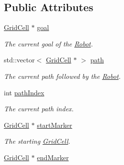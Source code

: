 \subsection*{Public Attributes}
\begin{DoxyCompactItemize}
\item 
\hyperlink{classGridCell}{Grid\+Cell} $\ast$ \hyperlink{classRobot_a5abff8bb9893b5fbd509c20e7fa2ffb5}{goal}\hypertarget{classRobot_a5abff8bb9893b5fbd509c20e7fa2ffb5}{}\label{classRobot_a5abff8bb9893b5fbd509c20e7fa2ffb5}

\begin{DoxyCompactList}\small\item\em The current goal of the \hyperlink{classRobot}{Robot}. \end{DoxyCompactList}\item 
std\+::vector$<$ \hyperlink{classGridCell}{Grid\+Cell} $\ast$ $>$ \hyperlink{classRobot_a6a62d6834a3be1352b81d380cc396e7b}{path}\hypertarget{classRobot_a6a62d6834a3be1352b81d380cc396e7b}{}\label{classRobot_a6a62d6834a3be1352b81d380cc396e7b}

\begin{DoxyCompactList}\small\item\em The current path followed by the \hyperlink{classRobot}{Robot}. \end{DoxyCompactList}\item 
int \hyperlink{classRobot_a4720ed975e9fae5466f00da717dbb522}{path\+Index}\hypertarget{classRobot_a4720ed975e9fae5466f00da717dbb522}{}\label{classRobot_a4720ed975e9fae5466f00da717dbb522}

\begin{DoxyCompactList}\small\item\em The current path index. \end{DoxyCompactList}\item 
\hyperlink{classGridCell}{Grid\+Cell} $\ast$ \hyperlink{classRobot_afec08358c6c5f12d6d85dfa78a1faa0b}{start\+Marker}\hypertarget{classRobot_afec08358c6c5f12d6d85dfa78a1faa0b}{}\label{classRobot_afec08358c6c5f12d6d85dfa78a1faa0b}

\begin{DoxyCompactList}\small\item\em The starting \hyperlink{classGridCell}{Grid\+Cell}. \end{DoxyCompactList}\item 
\hyperlink{classGridCell}{Grid\+Cell} $\ast$ \hyperlink{classRobot_a6743f0c8b4ae8377d4b275cb452eb924}{end\+Marker}\hypertarget{classRobot_a6743f0c8b4ae8377d4b275cb452eb924}{}\label{classRobot_a6743f0c8b4ae8377d4b275cb452eb924}


\end{DoxyCompactItemize}
